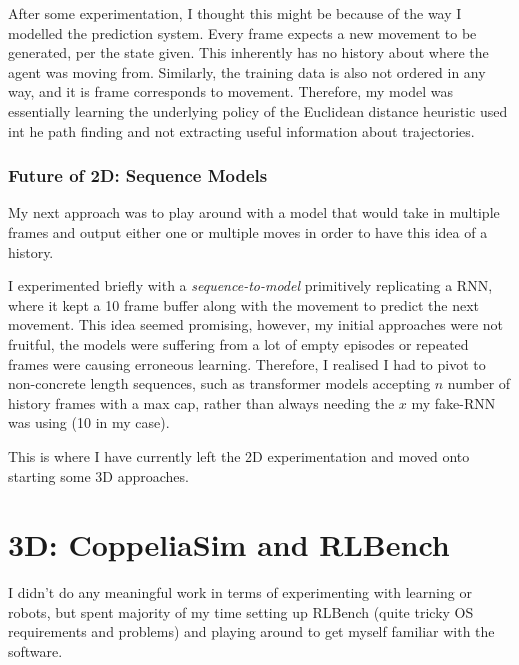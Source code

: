 After some experimentation, I thought this might be because of the way I modelled the prediction system. Every frame expects a new movement to be generated, per the state given. This inherently has no history about where the agent was moving from. Similarly, the training data is also not ordered in any way, and it is frame corresponds to movement. Therefore, my model was essentially learning the underlying policy of the Euclidean distance heuristic used int he path finding and not extracting useful information about trajectories.

\subsubsection{Future of 2D: Sequence Models}
My next approach was to play around with a model that would take in multiple frames and output either one or multiple moves in order to have this idea of a history.

I experimented briefly with a \emph{sequence-to-model} primitively replicating a RNN, where it kept a 10 frame buffer along with the movement to predict the next movement. This idea seemed promising, however, my initial approaches were not fruitful, the models were suffering from a lot of empty episodes or repeated frames were causing erroneous learning. Therefore, I realised I had to pivot to non-concrete length sequences, such as transformer models accepting $n$ number of history frames with a max cap, rather than always needing the $x$ my fake-RNN was using (10 in my case). 

This is where I have currently left the 2D experimentation and moved onto starting some 3D approaches.

\section{3D: CoppeliaSim and RLBench}
I didn't do any meaningful work in terms of experimenting with learning or robots, but spent majority of my time setting up RLBench (quite tricky OS requirements and problems) and playing around to get myself familiar with the software.